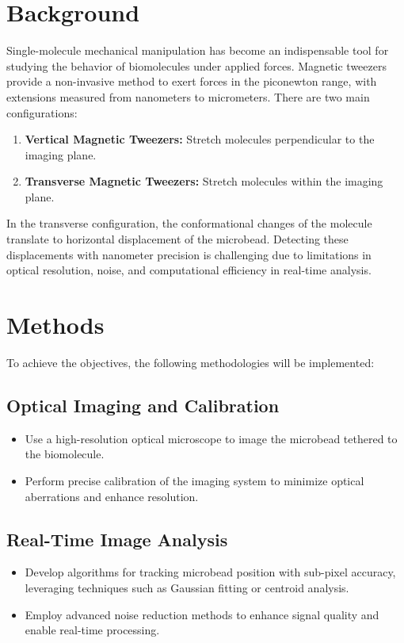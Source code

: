 \documentclass[12pt]{article}
\begin{document}
\section*{Background}
Single-molecule mechanical manipulation has become an indispensable tool for studying the behavior of biomolecules under applied forces. Magnetic tweezers provide a non-invasive method to exert forces in the piconewton range, with extensions measured from nanometers to micrometers. There are two main configurations:
\begin{enumerate}
    \item \textbf{Vertical Magnetic Tweezers:} Stretch molecules perpendicular to the imaging plane.
    \item \textbf{Transverse Magnetic Tweezers:} Stretch molecules within the imaging plane.
\end{enumerate}
In the transverse configuration, the conformational changes of the molecule translate to horizontal displacement of the microbead. Detecting these displacements with nanometer precision is challenging due to limitations in optical resolution, noise, and computational efficiency in real-time analysis.

\section*{Methods}
To achieve the objectives, the following methodologies will be implemented:

\subsection*{Optical Imaging and Calibration}
\begin{itemize}
    \item Use a high-resolution optical microscope to image the microbead tethered to the biomolecule.
    \item Perform precise calibration of the imaging system to minimize optical aberrations and enhance resolution.
\end{itemize}

\subsection*{Real-Time Image Analysis}
\begin{itemize}
    \item Develop algorithms for tracking microbead position with sub-pixel accuracy, leveraging techniques such as Gaussian fitting or centroid analysis.
    \item Employ advanced noise reduction methods to enhance signal quality and enable real-time processing.
\end{itemize}
\end{document}
